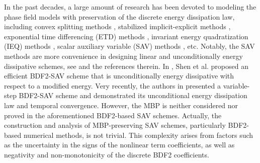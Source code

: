 \documentclass{m2an}
\begin{document}
In the past decades, a large amount of research has been devoted to modeling the phase field models with preservation of the discrete energy dissipation law, including convex splitting methods \cite{SINUM_2013_Baskaran,MRS_1998_Eyre}, stabilized implicit-explicit methods \cite{DCDS_2010_Shen,SINUM_2006_Xu}, exponential time differencing (ETD) methods \cite{SIREV_Du_2021,MOC_2018_Ju}, invariant energy quadratization (IEQ) methods \cite{JCP_2016_Yang}, scalar auxiliary variable (SAV) methods \cite{SINUM_2018_Shen,JCP_2018_Shen,SIREV_2019_Shen}, etc. Notably, the SAV methods are more convenience in designing linear and unconditionally energy dissipative schemes, see \cite{SISC_2019_Akrivis,BIT_2022_Kemmochi,SISC_2020_Liu} and the references therein. In \cite{JCP_2018_Shen,SIREV_2019_Shen}, Shen et al. proposed an efficient BDF2-SAV scheme that is unconditionally energy dissipative with respect to a modified energy. 
Very recently, the authors in \cite{JSC_Qiao_2023} presented a variable-step BDF2-SAV scheme and demonstrated its unconditional energy dissipation law and temporal convergence. However, the MBP is neither considered nor proved in the aforementioned BDF2-based SAV schemes. %
Actually, the construction and analysis of MBP-preserving SAV schemes, particularly BDF2-based numerical methods, is not trivial. This complexity arises from factors such as the uncertainty in the signs of the nonlinear term coefficients, as well as negativity and non-monotonicity of the discrete BDF2 coefficients.
\end{document}
